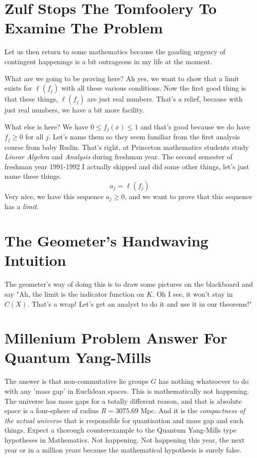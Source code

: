 \documentclass{amsart}
\begin{document}
\section{Zulf Stops The Tomfoolery To Examine The Problem}

Let us then return to some mathematics because the goading urgency of contingent happenings is a bit outrageous in my life at the moment.

What are we going to be proving here?  Ah yes, we want to show that a limit exists for $\ell(f_j)$ with all these various conditions.  Now the first good thing is that these things, $\ell(f_j)$ are just real numbers.  That's a relief, because with just real numbers, we have a bit more facility.  

What else is here?  We have $0 \le f_j(x) \le 1$ and that's good because we do have $f_j\ge 0$ for all $j$.  Let's name them so they seem familiar from the first analysis course from baby Rudin.  That's right, at Princeton mathematics students study {\em Linear Algebra} and {\em Analysis} during freshman year.  The second semester of freshman year 1991-1992 I actually skipped and did some other things, let's just name these things.
\[
a_j = \ell(f_j)
\]
Very nice, we have this sequence $a_j \ge 0$, and we want to prove that this sequence has a {\em limit}.  

\section{The Geometer's Handwaving Intuition}

The geometer's way of doing this is to draw some pictures on the blackboard and say "Ah, the limit is the indicator function on $K$. Oh I see, it won't stay in $C(X)$.  That's a wrap!  Let's get an analyst to do it and use it in our theorems!"

\section{Millenium Problem Answer For Quantum Yang-Mills}

The answer is that non-commutative lie groups $G$ has nothing whatsoever to do with any 'mass gap' in Euclidean spaces.  This is mathematically not happening.  The universe has mass gaps for a totally different reason, and that is absolute space is a four-sphere of radius $R=3075.69$ Mpc.  And it is the {\em compactness of the actual universe} that is responsible for quantisation and mass gap and such things.  Expect a thorough counterexample to the Quantum Yang-Mills type hypotheses in Mathematics.  Not happening.  Not happening this year, the next year or in a million years because the mathematical hypothesis is surely false.
\end{document}
